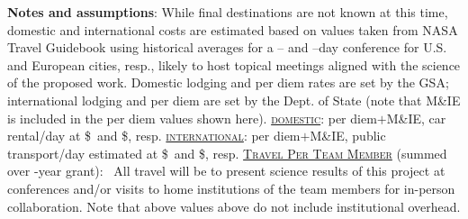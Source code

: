 
\begin{isANONtravel}
\caption{\normalsize \newline \newline
\textbf{Notes and assumptions}:
\newline \newline
While final destinations are not known at this time, domestic and international costs are estimated based on values taken from NASA Travel Guidebook using historical averages for a \daysPerDomesticTrip-- and \daysPerInternationalTrip--day conference for U.S. and European cities, resp., likely to host topical meetings aligned with the science of the proposed work. Domestic lodging and per diem rates are set by the GSA; international lodging and per diem are set by the Dept. of State (note that M\&IE is included in the per diem values shown here).
\newline \newline {}
\newline \newline \underline{\scshape{domestic}}:
per diem$+$M\&IE, car rental/day at \$\domesticPerDiemDollars\ and \$\domesticGroundTravelDollars, resp.
\newline \newline \underline{\scshape{international}}:
per diem$+$M\&IE, public transport/day estimated at  \$\internationalPerDiemDollars\ and \$\internationalGroundTravelDollars, resp.
\newline \newline \underline{\scshape{Travel Per Team Member}}
(summed over \grantYears-year grant):
\newline
\perPersonNumberTripsList\
\newline All travel will be to present science results of this project at conferences and/or visits to home institutions of the team members for in-person collaboration. Note that above values above do not include institutional overhead.}
\label{tab:isANONtravel}
\end{isANONtravel}
